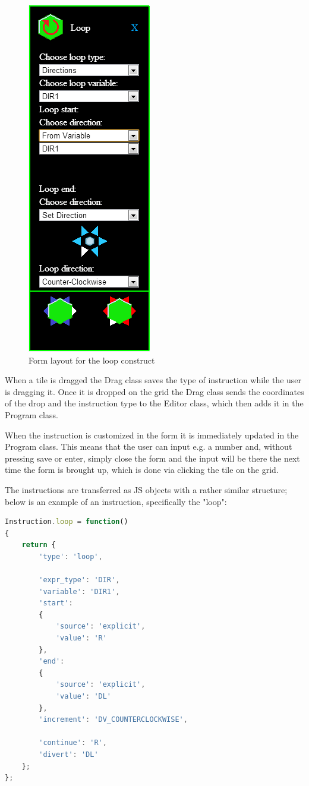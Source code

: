 \begin{figure}[ht]
\includegraphics[scale=1]{img/editor_loop_form.png}
\caption{Form layout for the loop construct}
\label{fig:form_layout}
\end{figure}

When a tile is dragged the Drag class saves the type of instruction while the user is dragging it. Once it is dropped on the grid the Drag class sends the coordinates of the drop and the instruction type to the Editor class, which then adds it in the Program class. 

When the instruction is customized in the form it is immediately updated in the Program class. This means that the user can input e.g. a number and, without pressing save or enter, simply close the form and the input will be there the next time the form is brought up, which is done via clicking the tile on the grid.

The instructions are transferred as JS objects with a rather similar structure; below is an example of an instruction, specifically the "loop":

\begin{lstlisting}[language=javascript]
Instruction.loop = function()
{
	return {
		'type': 'loop',

		'expr_type': 'DIR',
		'variable': 'DIR1',
		'start':
		{
			'source': 'explicit',
			'value': 'R'
		},
		'end':
		{
			'source': 'explicit',
			'value': 'DL'
		},
		'increment': 'DV_COUNTERCLOCKWISE',
		
		'continue': 'R',
		'divert': 'DL'
	};
};
\end{lstlisting}

